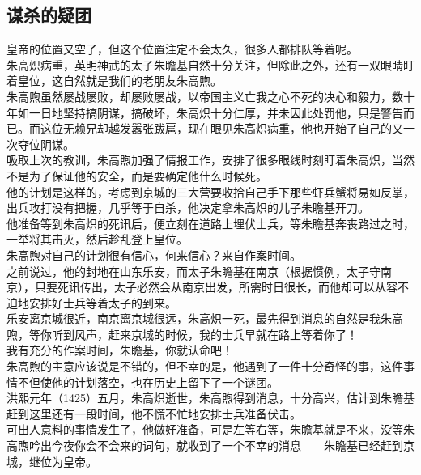 \begin{multicols}{\theparacolNo}
\subsection{谋杀的疑团}
皇帝的位置又空了，但这个位置注定不会太久，很多人都排队等着呢。\\

朱高炽病重，英明神武的太子朱瞻基自然十分关注，但除此之外，还有一双眼睛盯着皇位，这自然就是我们的老朋友朱高煦。\\

朱高煦虽然屡战屡败，却屡败屡战，以帝国主义亡我之心不死的决心和毅力，数十年如一日地坚持搞阴谋，搞破坏，朱高炽十分仁厚，并未因此处罚他，只是警告而已。而这位无赖兄却越发嚣张跋扈，现在眼见朱高炽病重，他也开始了自己的又一次夺位阴谋。\\

吸取上次的教训，朱高煦加强了情报工作，安排了很多眼线时刻盯着朱高炽，当然不是为了保证他的安全，而是要确定他什么时候死。\\

他的计划是这样的，考虑到京城的三大营要收拾自己手下那些虾兵蟹将易如反掌，出兵攻打没有把握，几乎等于自杀，他决定拿朱高炽的儿子朱瞻基开刀。\\

他准备等到朱高炽的死讯后，便立刻在道路上埋伏士兵，等朱瞻基奔丧路过之时，一举将其击灭，然后趁乱登上皇位。\\

朱高煦对自己的计划很有信心，何来信心？来自作案时间。\\

之前说过，他的封地在山东乐安，而太子朱瞻基在南京（根据惯例，太子守南京），只要死讯传出，太子必然会从南京出发，所需时日很长，而他却可以从容不迫地安排好士兵等着太子的到来。\\

乐安离京城很近，南京离京城很远，朱高炽一死，最先得到消息的自然是我朱高煦，等你听到风声，赶来京城的时候，我的士兵早就在路上等着你了！\\

我有充分的作案时间，朱瞻基，你就认命吧！\\

朱高煦的主意应该说是不错的，但不幸的是，他遇到了一件十分奇怪的事，这件事情不但使他的计划落空，也在历史上留下了一个谜团。\\

洪熙元年（1425）五月，朱高炽逝世，朱高煦得到消息，十分高兴，估计到朱瞻基赶到这里还有一段时间，他不慌不忙地安排士兵准备伏击。\\

可出人意料的事情发生了，他做好准备，可是左等右等，朱瞻基就是不来，没等朱高煦吟出今夜你会不会来的词句，就收到了一个不幸的消息——朱瞻基已经赶到京城，继位为皇帝。\\


\end{multicols}

